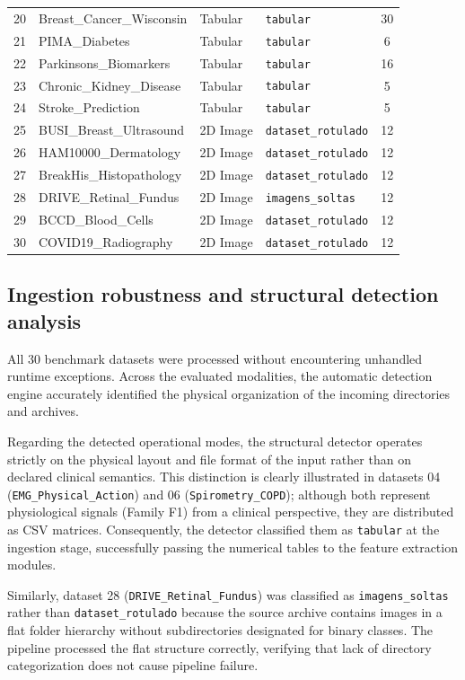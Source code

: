 \begin{table}[htbp]
\begin{tabular}{@{}rlllc@{}}
20 & Breast\_Cancer\_Wisconsin & Tabular & \texttt{tabular} & 30 \\
21 & PIMA\_Diabetes & Tabular & \texttt{tabular} & 6 \\
22 & Parkinsons\_Biomarkers & Tabular & \texttt{tabular} & 16 \\
23 & Chronic\_Kidney\_Disease & Tabular & \texttt{tabular} & 5 \\
24 & Stroke\_Prediction & Tabular & \texttt{tabular} & 5 \\ \midrule
25 & BUSI\_Breast\_Ultrasound & 2D Image & \texttt{dataset\_rotulado} & 12 \\
26 & HAM10000\_Dermatology & 2D Image & \texttt{dataset\_rotulado} & 12 \\
27 & BreakHis\_Histopathology & 2D Image & \texttt{dataset\_rotulado} & 12 \\
28 & DRIVE\_Retinal\_Fundus & 2D Image & \texttt{imagens\_soltas} & 12 \\
29 & BCCD\_Blood\_Cells & 2D Image & \texttt{dataset\_rotulado} & 12 \\
30 & COVID19\_Radiography & 2D Image & \texttt{dataset\_rotulado} & 12 \\ \bottomrule
\end{tabular}
\end{table}

\subsection{Ingestion robustness and structural detection analysis}
All 30 benchmark datasets were processed without encountering unhandled runtime exceptions. Across the evaluated modalities, the automatic detection engine accurately identified the physical organization of the incoming directories and archives.

Regarding the detected operational modes, the structural detector operates strictly on the physical layout and file format of the input rather than on declared clinical semantics. This distinction is clearly illustrated in datasets 04 (\texttt{EMG\_Physical\_Action}) and 06 (\texttt{Spirometry\_COPD}); although both represent physiological signals (Family F1) from a clinical perspective, they are distributed as CSV matrices. Consequently, the detector classified them as \texttt{tabular} at the ingestion stage, successfully passing the numerical tables to the feature extraction modules.

Similarly, dataset 28 (\texttt{DRIVE\_Retinal\_Fundus}) was classified as \texttt{imagens\_soltas} rather than \texttt{dataset\_rotulado} because the source archive contains images in a flat folder hierarchy without subdirectories designated for binary classes. The pipeline processed the flat structure correctly, verifying that lack of directory categorization does not cause pipeline failure.

